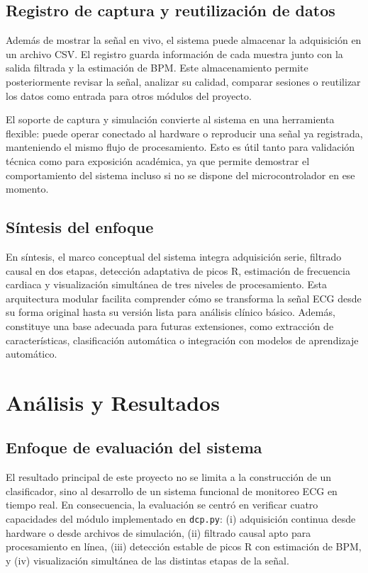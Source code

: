 \subsection{Registro de captura y reutilización de datos}

Además de mostrar la señal en vivo, el sistema puede almacenar la adquisición en un archivo CSV. El registro guarda información de cada muestra junto con la salida filtrada y la estimación de BPM. Este almacenamiento permite posteriormente revisar la señal, analizar su calidad, comparar sesiones o reutilizar los datos como entrada para otros módulos del proyecto.

El soporte de captura y simulación convierte al sistema en una herramienta flexible: puede operar conectado al hardware o reproducir una señal ya registrada, manteniendo el mismo flujo de procesamiento. Esto es útil tanto para validación técnica como para exposición académica, ya que permite demostrar el comportamiento del sistema incluso si no se dispone del microcontrolador en ese momento.

\subsection{Síntesis del enfoque}

En síntesis, el marco conceptual del sistema integra adquisición serie, filtrado causal en dos etapas, detección adaptativa de picos R, estimación de frecuencia cardiaca y visualización simultánea de tres niveles de procesamiento. Esta arquitectura modular facilita comprender cómo se transforma la señal ECG desde su forma original hasta su versión lista para análisis clínico básico. Además, constituye una base adecuada para futuras extensiones, como extracción de características, clasificación automática o integración con modelos de aprendizaje automático.

\section{Análisis y Resultados}

\subsection{Enfoque de evaluación del sistema}

El resultado principal de este proyecto no se limita a la construcción de un
clasificador, sino al desarrollo de un sistema funcional de monitoreo ECG en
tiempo real. En consecuencia, la evaluación se centró en verificar cuatro
capacidades del módulo implementado en \texttt{dcp.py}: (i) adquisición continua
desde hardware o desde archivos de simulación, (ii) filtrado causal apto para
procesamiento en línea, (iii) detección estable de picos R con estimación de BPM,
y (iv) visualización simultánea de las distintas etapas de la señal.

